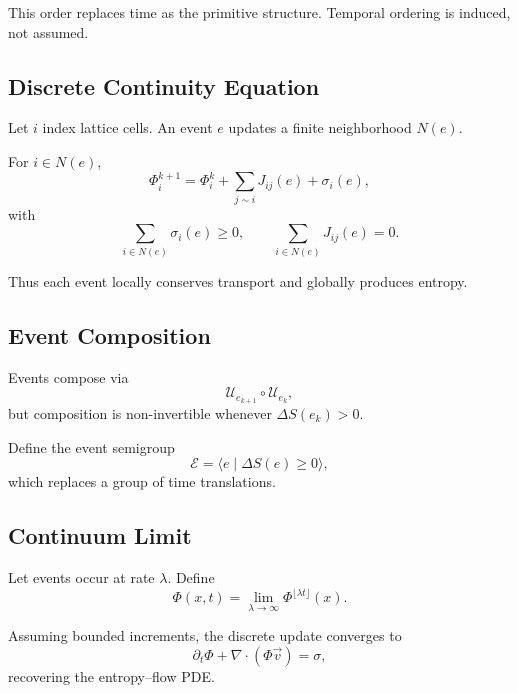 \documentclass[11pt]{article}
\begin{document}
This order replaces time as the primitive structure.
Temporal ordering is induced, not assumed.


\subsection*{Discrete Continuity Equation}

Let $i$ index lattice cells.
An event $e$ updates a finite neighborhood $N(e)$.

For $i \in N(e)$,
\begin{equation}
\Phi_i^{k+1}
=
\Phi_i^k
+
\sum_{j \sim i} J_{ij}(e)
+
\sigma_i(e),
\end{equation}
with
\begin{equation}
\sum_{i \in N(e)} \sigma_i(e) \ge 0,
\qquad
\sum_{i \in N(e)} J_{ij}(e) = 0.
\end{equation}

Thus each event locally conserves transport and globally produces entropy.

\subsection*{Event Composition}

Events compose via
\begin{equation}
\mathcal{U}_{e_{k+1}} \circ \mathcal{U}_{e_k},
\end{equation}
but composition is non-invertible whenever $\Delta S(e_k)>0$.

Define the event semigroup
\begin{equation}
\mathcal{E} = \langle e \mid \Delta S(e) \ge 0 \rangle,
\end{equation}
which replaces a group of time translations.

\subsection*{Continuum Limit}

Let events occur at rate $\lambda$.
Define
\begin{equation}
\Phi(x,t)
=
\lim_{\lambda \to \infty}
\Phi^{\lfloor \lambda t \rfloor}(x).
\end{equation}

Assuming bounded increments,
the discrete update converges to
\begin{equation}
\partial_t \Phi + \nabla \cdot (\Phi \vec{v}) = \sigma,
\end{equation}
recovering the entropy--flow PDE.
\end{document}

